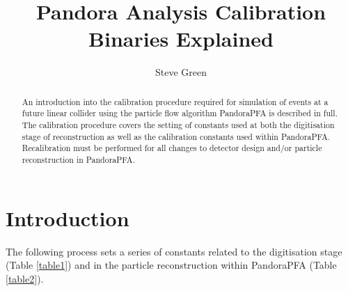 \documentclass[11pt, oneside]{article}   	%
\title{Pandora Analysis Calibration Binaries Explained}
\author{Steve Green}
\date{}							%
\begin{document}
\maketitle


\begin{abstract}
An introduction into the calibration procedure required for simulation of events at a future linear collider using the particle flow algorithm PandoraPFA is described in full.  The calibration procedure covers the setting of constants used at both the digitisation stage of reconstruction as well as the calibration constants used within PandoraPFA.  Recalibration must be performed for all changes to detector design and/or particle reconstruction in PandoraPFA.
\end{abstract}


\section{Introduction}

The following process sets a series of constants related to the digitisation stage (Table \ref{table1}) and in the particle reconstruction within PandoraPFA (Table \ref{table2}).

\end{document}
